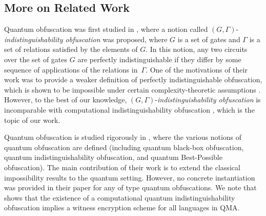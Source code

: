 \subsection{More on Related Work}
\label{sec:obf-quantum}
Quantum obfuscation was first studied in \cite{AJJ14}, where a notion called
$(G,\Gamma)$-{\em indistinguishability obfuscation} was proposed,  where $G$ is a set of gates and $\Gamma$ is a set of relations satisfied by the elements of $G$. In this notion, any two circuits over the set of gates $G$ are perfectly indistinguishable if they differ by some sequence of applications of the relations in~$\Gamma.$ One of the motivations of their work was to provide a weaker definition of perfectly indistinguishable obfuscation, which is shown to be impossible under certain complexity-theoretic assumptions \cite{AJJ14}. However, to the best of our knowledge, $(G,\Gamma)$-{\em indistinguishability obfuscation} is incomparable with computational indistinguishability obfuscation \cite{BGI+12, GGH+13}, which is the topic of our work.

Quantum obfuscation is studied rigorously in \cite{AF16arxiv}, where the various notions of quantum obfuscation are defined (including quantum black-box obfuscation, quantum indistinguishability obfuscation, and quantum Best-Possible obfuscation). 
%
 The main contribution of their work is to extend the classical impossibility results to the quantum setting.
 However, no concrete instantiation was provided in their paper for any of type quantum obfuscations. 
  We note that  \cite{AF16arxiv} shows that the existence of a computational quantum indistinguishability obfuscation implies a witness encryption scheme for all languages in \textsf{QMA}.


%
%


